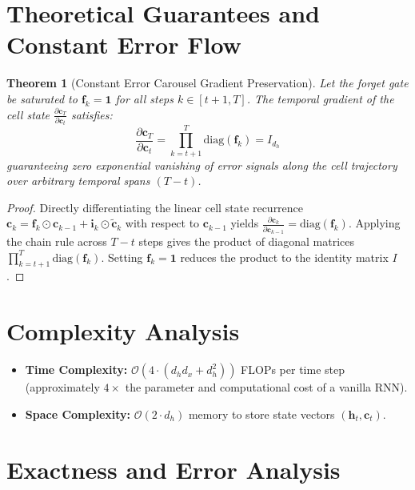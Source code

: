 \documentclass[11pt,a4paper]{article}
\newtheorem{theorem}{Theorem}
\theoremstyle{definition}
\begin{document}
\section{Theoretical Guarantees and Constant Error Flow}

\begin{theorem}[Constant Error Carousel Gradient Preservation]
\label{thm:cec_gradient}
Let the forget gate be saturated to $\mathbf{f}_k = \mathbf{1}$ for all steps $k \in [t+1, T]$. The temporal gradient of the cell state $\frac{\partial \mathbf{c}_T}{\partial \mathbf{c}_t}$ satisfies:
\begin{equation}
\frac{\partial \mathbf{c}_T}{\partial \mathbf{c}_t} = \prod_{k=t+1}^T \text{diag}(\mathbf{f}_k) = I_{d_h}
\end{equation}
guaranteeing zero exponential vanishing of error signals along the cell trajectory over arbitrary temporal spans $(T - t)$.
\end{theorem}

\begin{proof}
Directly differentiating the linear cell state recurrence $\mathbf{c}_k = \mathbf{f}_k \odot \mathbf{c}_{k-1} + \mathbf{i}_k \odot \tilde{\mathbf{c}}_k$ with respect to $\mathbf{c}_{k-1}$ yields $\frac{\partial \mathbf{c}_k}{\partial \mathbf{c}_{k-1}} = \text{diag}(\mathbf{f}_k)$. Applying the chain rule across $T - t$ steps gives the product of diagonal matrices $\prod_{k=t+1}^T \text{diag}(\mathbf{f}_k)$. Setting $\mathbf{f}_k = \mathbf{1}$ reduces the product to the identity matrix $I$.
\end{proof}

\section{Complexity Analysis}

\begin{itemize}
    \item \textbf{Time Complexity:} $\mathcal{O}(4 \cdot (d_h d_x + d_h^2))$ FLOPs per time step (approximately $4\times$ the parameter and computational cost of a vanilla RNN).
    \item \textbf{Space Complexity:} $\mathcal{O}(2 \cdot d_h)$ memory to store state vectors $(\mathbf{h}_t, \mathbf{c}_t)$.
\end{itemize}

\section{Exactness and Error Analysis}
\end{document}
